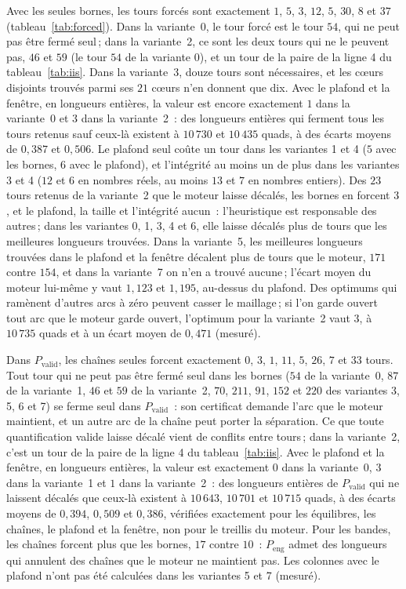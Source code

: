 \documentclass[11pt,a4paper]{article}
\begin{document}
Avec les seules bornes, les tours forcés sont exactement $1$, $5$, $3$, $12$,
$5$, $30$, $8$ et $37$ (tableau~\ref{tab:forced}). Dans la variante~0, le tour
forcé est le tour $54$, qui ne peut pas être fermé seul\,; dans la
variante~2, ce sont les deux tours qui ne le peuvent pas, $46$ et $59$ (le
tour $54$ de la variante 0), et un tour de la paire de la ligne 4 du
tableau~\ref{tab:iis}. Dans la variante~3, douze tours sont nécessaires, et
les cœurs disjoints trouvés parmi ses $21$ cœurs n'en donnent que dix. Avec
le plafond et la fenêtre, en longueurs entières, la valeur est encore
exactement $1$ dans la variante~0 et $3$ dans la variante~2~: des longueurs
entières qui ferment tous les tours retenus sauf ceux-là existent à
$10\,730$ et $10\,435$ quads, à des écarts moyens de $0,387$ et $0,506$. Le
plafond seul coûte un tour dans les variantes 1 et 4 ($5$ avec les bornes,
$6$ avec le plafond), et l'intégrité au moins un de plus dans les variantes 3
et 4 ($12$ et $6$ en nombres réels, au moins $13$ et $7$ en nombres entiers).
Des $23$ tours retenus de la variante~2 que le moteur laisse décalés, les
bornes en forcent $3$, et le plafond, la taille et l'intégrité aucun~:
l'heuristique est responsable des autres\,; dans les variantes 0, 1, 3, 4 et
6, elle laisse décalés plus de tours que les meilleures longueurs trouvées.
Dans la variante~5, les meilleures longueurs trouvées dans le plafond et la
fenêtre décalent plus de tours que le moteur, $171$ contre $154$, et dans la
variante~7 on n'en a trouvé aucune\,; l'écart moyen du moteur lui-même y vaut
$1,123$ et $1,195$, au-dessus du plafond. Des optimums qui ramènent d'autres
arcs à zéro peuvent casser le maillage\,; si l'on garde ouvert tout arc que le
moteur garde ouvert, l'optimum pour la variante~2 vaut $3$, à $10\,735$ quads
et à un écart moyen de $0,471$ (mesuré).

Dans $P_{\mathrm{valid}}$, les chaînes seules forcent exactement $0$, $3$, $1$,
$11$, $5$, $26$, $7$ et $33$ tours. Tout tour qui ne peut pas être fermé seul
dans les bornes ($54$ de la variante~0, $87$ de la variante~1, $46$ et $59$ de
la variante~2, $70$, $211$, $91$, $152$ et $220$ des variantes 3, 5, 6 et 7)
se ferme seul dans $P_{\mathrm{valid}}$~: son certificat demande l'arc que le
moteur maintient, et un autre arc de la chaîne peut porter la séparation. Ce
que toute quantification valide laisse décalé vient de conflits entre
tours\,; dans la variante~2, c'est un tour de la paire de la ligne 4 du
tableau~\ref{tab:iis}. Avec le plafond et la fenêtre, en longueurs entières,
la valeur est exactement $0$ dans la variante~0, $3$ dans la variante~1 et $1$
dans la variante~2~: des longueurs entières de $P_{\mathrm{valid}}$ qui ne
laissent décalés que ceux-là existent à $10\,643$, $10\,701$ et $10\,715$
quads, à des écarts moyens de $0,394$, $0,509$ et $0,386$, vérifiées
exactement pour les équilibres, les chaînes, le plafond et la fenêtre, non
pour le treillis du moteur. Pour les bandes, les chaînes forcent plus que les
bornes, $17$ contre $10$~: $P_{\mathrm{eng}}$ admet des longueurs qui annulent
des chaînes que le moteur ne maintient pas. Les colonnes avec le plafond n'ont
pas été calculées dans les variantes 5 et 7 (mesuré).
\end{document}
